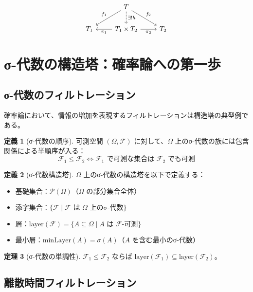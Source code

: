 \documentclass[a4paper,12pt]{article}
\theoremstyle{definition}
\newtheorem{definition}{定義}[section]
\newtheorem{theorem}[definition]{定理}
\begin{document}
\[
\begin{tikzcd}
& T \arrow[dl, "f_1"'] \arrow[dr, "f_2"] \arrow[d, dashed, "\exists! h"] & \\
T_1 & T_1 \times T_2 \arrow[l, "\pi_1"] \arrow[r, "\pi_2"'] & T_2
\end{tikzcd}
\]

\section{σ-代数の構造塔：確率論への第一歩}

\subsection{σ-代数のフィルトレーション}

確率論において、情報の増加を表現するフィルトレーションは構造塔の典型例である。

\begin{definition}[σ-代数の順序]
可測空間 $(\Omega, \mathcal{F})$ に対して、$\Omega$ 上のσ-代数の族には包含関係による半順序が入る：
\[
\mathcal{F}_1 \leq \mathcal{F}_2 \iff \text{$\mathcal{F}_1$ で可測な集合は $\mathcal{F}_2$ でも可測}
\]
\end{definition}

\begin{definition}[σ-代数構造塔]
$\Omega$ 上のσ-代数の構造塔を以下で定義する：
\begin{itemize}
\item 基礎集合：$\mathcal{P}(\Omega)$（$\Omega$ の部分集合全体）
\item 添字集合：$\{\mathcal{F} \mid \mathcal{F} \text{ は } \Omega \text{ 上のσ-代数}\}$
\item 層：$\text{layer}(\mathcal{F}) = \{A \subseteq \Omega \mid A \text{ は } \mathcal{F}\text{-可測}\}$
\item 最小層：$\text{minLayer}(A) = \sigma(A)$（$A$ を含む最小のσ-代数）
\end{itemize}
\end{definition}

\begin{theorem}[σ-代数の単調性]
$\mathcal{F}_1 \leq \mathcal{F}_2$ ならば $\text{layer}(\mathcal{F}_1) \subseteq \text{layer}(\mathcal{F}_2)$。
\end{theorem}

\subsection{離散時間フィルトレーション}
\end{document}
